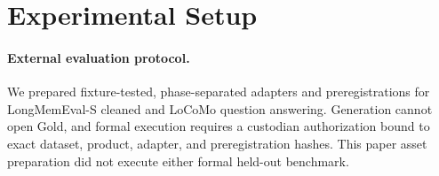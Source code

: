 \section{Experimental Setup}


\paragraph{External evaluation protocol.}
We prepared fixture-tested, phase-separated adapters and preregistrations for
LongMemEval-S cleaned and LoCoMo question answering. Generation cannot open
Gold, and formal execution requires a custodian authorization bound to exact
dataset, product, adapter, and preregistration hashes. This paper asset
preparation did not execute either formal held-out benchmark.
